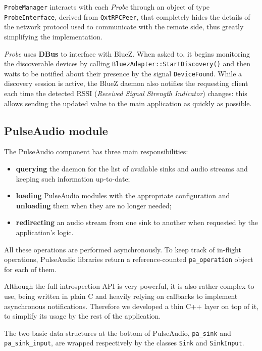 \documentclass{IEEEtran}
\newcommand{\Probe}{\textsl{Probe}}
\begin{document}
\texttt{ProbeManager} interacts with each \Probe{} through an object of type \texttt{ProbeInterface}, derived from \texttt{QxtRPCPeer}, that completely hides the details of the network protocol used to communicate with the remote side, thus greatly simplifying the implementation.

\Probe{} uses \textbf{DBus} to interface with BlueZ. When asked to, it begins monitoring the discoverable devices by calling \texttt{BluezAdapter::StartDiscovery()} and then waits to be notified about their presence by the signal \texttt{DeviceFound}. While a discovery session is active, the BlueZ daemon also notifies the requesting client each time the detected RSSI (\textit{Received Signal Strength Indicator}) changes: this allows sending the updated value to the main application as quickly as possible.

\subsection{PulseAudio module}
\label{pamod}
The PulseAudio component has three main responsibilities:
\begin{itemize}
	\item \textbf{querying} the daemon for the list of available sinks and audio streams and keeping such information up-to-date;
	\item \textbf{loading} PulseAudio modules with the appropriate configuration and \textbf{unloading} them when they are no longer needed;
	\item \textbf{redirecting} an audio stream from one sink to another when requested by the application's logic.
\end{itemize}
All these operations are performed asynchronously. To keep track of in-flight operations, PulseAudio libraries return a reference-counted \texttt{pa\_operation} object for each of them.

Although the full introspection API is very powerful, it is also rather complex to use, being written in plain C and heavily relying on callbacks to implement asynchronous notifications. Therefore we developed a thin C++ layer on top of it, to simplify its usage by the rest of the application.

The two basic data structures at the bottom of PulseAudio, \texttt{pa\_sink} and \texttt{pa\_sink\_input}, are wrapped respectively by the classes \texttt{Sink} and \texttt{SinkInput}.
\end{document}
